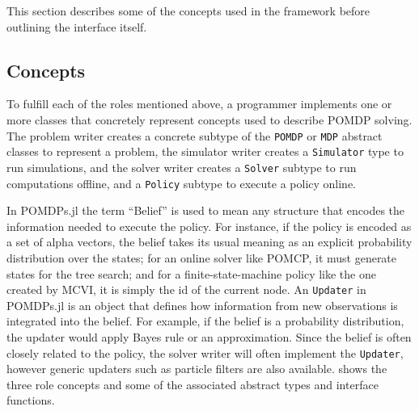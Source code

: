
This section describes some of the concepts used in the framework before outlining the interface itself.

\subsection{Concepts}

To fulfill each of the roles mentioned above, a programmer implements one or more classes that concretely represent concepts used to describe POMDP solving.
The problem writer creates a concrete subtype of the \texttt{POMDP} or \texttt{MDP} abstract classes to represent a problem, the simulator writer creates a \texttt{Simulator} type to run simulations, and the solver writer creates a \texttt{Solver} subtype to run computations offline, and a \texttt{Policy} subtype to execute a policy online.

In POMDPs.jl the term ``Belief'' is used to mean any structure that encodes the information needed to execute the policy.
For instance, if the policy is encoded as a set of alpha vectors, the belief takes its usual meaning as an explicit probability distribution over the states; for an online solver like POMCP, it must generate states for the tree search; and for a finite-state-machine policy like the one created by MCVI, it is simply the id of the current node.
An \texttt{Updater} in POMDPs.jl is an object that defines how information from new observations is integrated into the belief.
For example, if the belief is a probability distribution, the updater would apply Bayes rule or an approximation.
Since the belief is often closely related to the policy, the solver writer will often implement the \texttt{Updater}, however generic updaters such as particle filters are also available.
 shows the three role concepts and some of the associated abstract types and interface functions.

